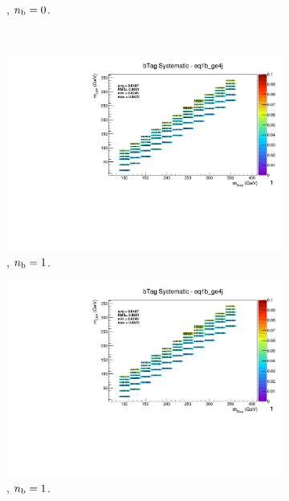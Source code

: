 \begin{figure}[ht!]
\begin{subfigure}[b]{0.32\textwidth}
    \caption{\njhigh, $n_{\text{b}} = 0$.}
  \end{subfigure}\\
  \begin{subfigure}[b]{0.32\textwidth}
    \includegraphics[width=\textwidth, page=12]{Figs/sms/t2cc/v37/systs/T2cc_bTag_eq1b_ge4j.pdf}
    \caption{\njhigh, $n_{\text{b}} = 1$.}
  \end{subfigure}
  \begin{subfigure}[b]{0.32\textwidth}
    \includegraphics[width=\textwidth, page=8]{Figs/sms/t2cc/v37/systs/T2cc_bTag_eq1b_ge4j.pdf}
    \caption{\njhigh, $n_{\text{b}} = 1$.}
  \end{subfigure}
  \begin{subfigure}[b]{0.32\textwidth}

\end{subfigure}
\end{figure}

